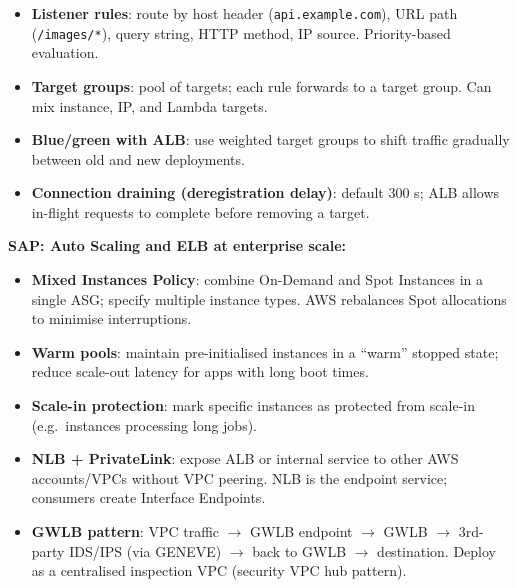 \begin{itemize}
  \item \textbf{Listener rules}: route by host header (\texttt{api.example.com}), URL path
        (\texttt{/images/*}), query string, HTTP method, IP source. Priority-based evaluation.
  \item \textbf{Target groups}: pool of targets; each rule forwards to a target group.
        Can mix instance, IP, and Lambda targets.
  \item \textbf{Blue/green with ALB}: use weighted target groups to shift traffic gradually
        between old and new deployments.
  \item \textbf{Connection draining (deregistration delay)}: default 300 s; ALB allows in-flight
        requests to complete before removing a target.
\end{itemize}

\begin{sapdepth}
\textbf{SAP: Auto Scaling and ELB at enterprise scale:}
\begin{itemize}
  \item \textbf{Mixed Instances Policy}: combine On-Demand and Spot Instances in a single ASG;
        specify multiple instance types. AWS rebalances Spot allocations to minimise interruptions.
  \item \textbf{Warm pools}: maintain pre-initialised instances in a ``warm'' stopped state;
        reduce scale-out latency for apps with long boot times.
  \item \textbf{Scale-in protection}: mark specific instances as protected from scale-in
        (e.g.\ instances processing long jobs).
  \item \textbf{NLB + PrivateLink}: expose ALB or internal service to other AWS accounts/VPCs
        without VPC peering. NLB is the endpoint service; consumers create Interface Endpoints.
  \item \textbf{GWLB pattern}: VPC traffic $\rightarrow$ GWLB endpoint $\rightarrow$ GWLB $\rightarrow$
        3rd-party IDS/IPS (via GENEVE) $\rightarrow$ back to GWLB $\rightarrow$ destination.
        Deploy as a centralised inspection VPC (security VPC hub pattern).
\end{itemize}
\end{sapdepth}
